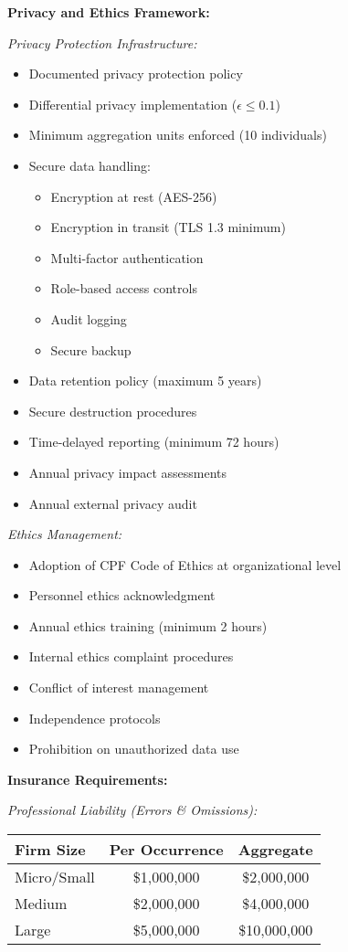 \documentclass[11pt,a4paper]{article}
\begin{document}
\textbf{Privacy and Ethics Framework:}

\textit{Privacy Protection Infrastructure:}
\begin{itemize}
\item Documented privacy protection policy
\item Differential privacy implementation ($\epsilon \leq 0.1$)
\item Minimum aggregation units enforced (10 individuals)
\item Secure data handling:
\begin{itemize}
\item Encryption at rest (AES-256)
\item Encryption in transit (TLS 1.3 minimum)
\item Multi-factor authentication
\item Role-based access controls
\item Audit logging
\item Secure backup
\end{itemize}
\item Data retention policy (maximum 5 years)
\item Secure destruction procedures
\item Time-delayed reporting (minimum 72 hours)
\item Annual privacy impact assessments
\item Annual external privacy audit
\end{itemize}

\textit{Ethics Management:}
\begin{itemize}
\item Adoption of CPF Code of Ethics at organizational level
\item Personnel ethics acknowledgment
\item Annual ethics training (minimum 2 hours)
\item Internal ethics complaint procedures
\item Conflict of interest management
\item Independence protocols
\item Prohibition on unauthorized data use
\end{itemize}

\textbf{Insurance Requirements:}

\textit{Professional Liability (Errors \& Omissions):}

\begin{tabular}{|l|c|c|}
\hline
\textbf{Firm Size} & \textbf{Per Occurrence} & \textbf{Aggregate} \\
\hline
Micro/Small & \$1,000,000 & \$2,000,000 \\
Medium & \$2,000,000 & \$4,000,000 \\
Large & \$5,000,000 & \$10,000,000 \\
\hline
\end{tabular}
\end{document}
